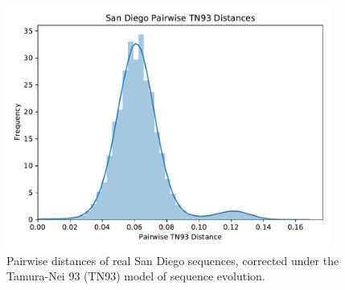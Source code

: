 \documentclass[a4paper,11pt]{article}
\begin{document}
\begin{figure}[!h]
\centering
\includegraphics[width=0.95\textwidth]{figs/sd.tn93.real.pdf}
\caption{Pairwise distances of real San Diego sequences, corrected under the Tamura-Nei 93 (TN93) model of sequence evolution.}
\label{fig:sd-real-tn93}
\end{figure}

\clearpage
\end{document}
